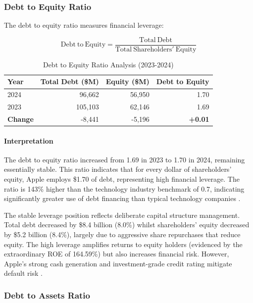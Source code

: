 \documentclass[12pt,a4paper]{article}
\begin{document}
\subsubsection{Debt to Equity Ratio}

The debt to equity ratio measures financial leverage:

\begin{equation}
\mathrm{Debt\ to\ Equity} = \frac{\mathrm{Total\ Debt}}{\mathrm{Total\ Shareholders'\ Equity}}
\end{equation}

\begin{table}[H]
\centering
\caption{Debt to Equity Ratio Analysis (2023-2024)}
\label{tab:de}
\begin{tabular}{lrrr}
\toprule
\textbf{Year} & \textbf{Total Debt (\$M)} & \textbf{Equity (\$M)} & \textbf{Debt to Equity} \\
\midrule
2024 & 96,662 & 56,950 & 1.70 \\
2023 & 105,103 & 62,146 & 1.69 \\
\textbf{Change} & -8,441 & -5,196 & \textbf{+0.01} \\
\bottomrule
\end{tabular}
\end{table}

\paragraph{Interpretation}

The debt to equity ratio increased from 1.69 in 2023 to 1.70 in 2024, remaining essentially stable. This ratio indicates that for every dollar of shareholders' equity, Apple employs \$1.70 of debt, representing high financial leverage. The ratio is 143\% higher than the technology industry benchmark of 0.7, indicating significantly greater use of debt financing than typical technology companies \citep{readyratios2024}.

The stable leverage position reflects deliberate capital structure management. Total debt decreased by \$8.4 billion (8.0\%) whilst shareholders' equity decreased by \$5.2 billion (8.4\%), largely due to aggressive share repurchases that reduce equity. The high leverage amplifies returns to equity holders (evidenced by the extraordinary ROE of 164.59\%) but also increases financial risk. However, Apple's strong cash generation and investment-grade credit rating mitigate default risk \citep{brealey2020}.

\subsubsection{Debt to Assets Ratio}
\end{document}
